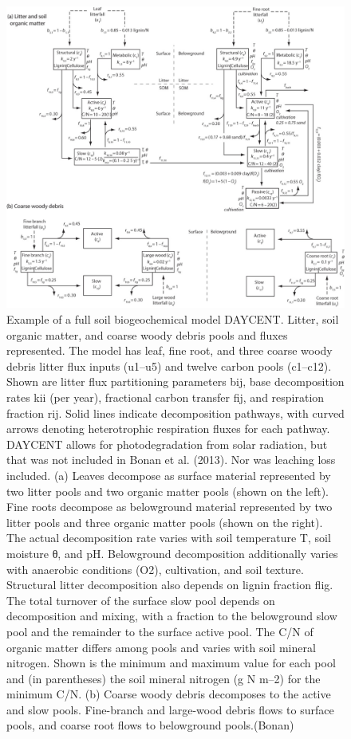 \documentclass[12pt,oneside]{book}
\begin{document}
\begin{figure}

{\centering \includegraphics[width=0.8\linewidth]{figures/chap5/f518_daycent} 

}

\caption{Example of a full soil biogeochemical model DAYCENT. Litter, soil organic matter, and coarse woody debris pools and fluxes represented. The model has leaf, fine root, and three coarse woody debris litter flux inputs (u1–u5) and twelve carbon pools (c1–c12). Shown are litter flux partitioning parameters bij, base decomposition rates kii (per year), fractional carbon transfer fij, and respiration fraction rij. Solid lines indicate decomposition pathways, with curved arrows denoting heterotrophic respiration fluxes for each pathway. DAYCENT allows for photodegradation from solar radiation, but that was not included in Bonan et al. (2013). Nor was leaching loss included. (a) Leaves decompose as surface material represented by two litter pools and two organic matter pools (shown on the left). Fine roots decompose as belowground material represented by two litter pools and three organic matter pools (shown on the right). The actual decomposition rate varies with soil temperature T, soil moisture θ, and pH. Belowground decomposition additionally varies with anaerobic conditions (O2), cultivation, and soil texture. Structural litter decomposition also depends on lignin fraction flig. The total turnover of the surface slow pool depends on decomposition and mixing, with a fraction to the belowground slow pool and the remainder to the surface active pool. The C/N of organic matter differs among pools and varies with soil mineral nitrogen. Shown is the minimum and maximum value for each pool and (in parentheses) the soil mineral nitrogen (g N m–2) for the minimum C/N. (b) Coarse woody debris decomposes to the active and slow pools. Fine-branch and large-wood debris flows to surface pools, and coarse root flows to belowground pools.(Bonan)}\label{fig:f518}
\end{figure}
\end{document}
